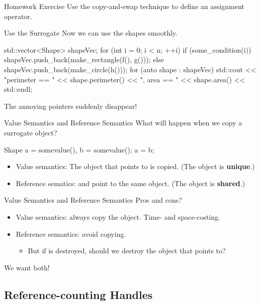 \documentclass{beamer}
\begin{document}
\begin{frame}{Homework Exercise}
    Use the copy-and-swap technique to define an assignment operator.
\end{frame}

\begin{frame}[fragile]{Use the Surrogate}
    Now we can use the shapes smoothly.
    \begin{cpp}
std::vector<Shape> shapeVec;
for (int i = 0; i < n; ++i) {
  if (some_condition(i))
    shapeVec.push_back(make_rectangle(f(), g()));
  else
    shapeVec.push_back(make_circle(h()));
}
for (auto shape : shapeVec) {
  std::cout << "perimeter == " << shape.perimeter()
            << ", area == " << shape.area() << std::endl;
}
    \end{cpp}
    The annoying pointers suddenly disappear!
\end{frame}

\begin{frame}[fragile]{Value Semantics and Reference Semantics}
    What will happen when we copy a surrogate object?
    \begin{cpp}
Shape a = somevalue(), b = somevalue();
a = b;
    \end{cpp}
    \begin{itemize}
        \item Value semantics: The object that  points to is copied. (The object is \textbf{unique}.)
        \item Reference sematics:  and  point to the same object. (The object is \textbf{shared}.)
    \end{itemize}
\end{frame}

\begin{frame}{Value Semantics and Reference Semantics}
    Pros and cons?
    \begin{itemize}
        \item Value semantics: always copy the object. Time- and space-costing.
        \item Reference semantics: avoid copying.
        \begin{itemize}
            \item But if  is destroyed, should we destroy the object that  points to?
        \end{itemize}
    \end{itemize}
    \pause
    We want both!
\end{frame}

\subsection{Reference-counting Handles}
\end{document}

